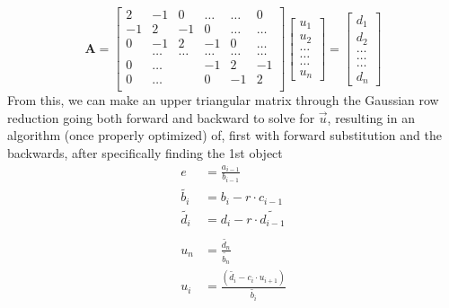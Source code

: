 \documentclass[10pt,showpacs,preprintnumbers,footinbib,amsmath,amssymb,aps,prl,twocolumn,groupedaddress,superscriptaddress,showkeys]{revtex4-1}
\begin{document}
 \[
\mathbf{A} = \begin{bmatrix}
                    2& -1& 0 &\dots   & \dots &0 \\
                    -1 & 2 & -1 &0 &\dots &\dots \\
                    0&-1 &2 & -1 & 0 & \dots \\
                    & \dots   & \dots &\dots   &\dots & \dots \\
                    0&\dots   &  &-1 &2& -1 \\
                    0&\dots    &  & 0  &-1 & 2 \\
              \end{bmatrix}
              \begin{bmatrix}
              		u_1 \\
              		u_2 \\
              		\dots \\
              		\dots \\
              		\dots \\
              		u_n
              \end{bmatrix} =
			  \begin{bmatrix}
              		d_1 \\
              		d_2 \\
              		\dots \\
              		\dots \\
              		\dots \\
              		d_n
              \end{bmatrix}              
\]
From this, we can make an upper triangular matrix through the Gaussian row reduction going both forward and backward to solve for $\vec{u}$, resulting in an algorithm (once properly optimized) of, first with forward substitution and the backwards, after specifically finding the 1st object 
\begin{equation*}
	\begin{aligned}
		e &= \frac{a_{i-1}}{b_{i-1}} \\
		\tilde{b_i} &= b_i - r\cdot c_{i-1} \\
		\tilde{d_i} &= d_i - r\cdot\tilde{d_{i-1}} \\ \\
		u_n &= \frac{\tilde{d_n}}{\tilde{b_n}} \\
		u_i &= \frac{(\tilde{d_i} - c_i\cdot u_{i+1})}{\tilde{b_i}}
	\end{aligned}
\end{equation*}
\end{document}

